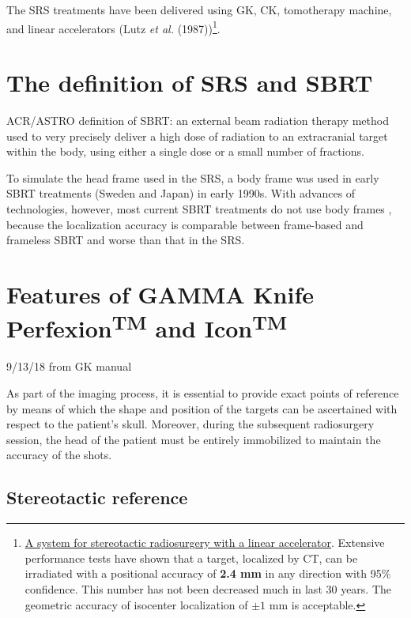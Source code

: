 \documentclass[]{book}
\let\rmarkdownfootnote\footnote%
\def\footnote{\protect\rmarkdownfootnote}
\theoremstyle{definition}
\theoremstyle{definition}
\theoremstyle{definition}
\theoremstyle{remark}
\begin{document}
The SRS treatments have been delivered using GK, CK, tomotherapy
machine, and linear accelerators (Lutz \emph{et al.} (1987))\footnote{\href{https://www.ncbi.nlm.nih.gov/pubmed/3276655}{A
  system for stereotactic radiosurgery with a linear accelerator}.
  Extensive performance tests have shown that a target, localized by CT,
  can be irradiated with a positional accuracy of \textbf{2.4 mm} in any
  direction with 95\% confidence. This number has not been decreased
  much in last 30 years. The geometric accuracy of isocenter
  localization of \(\pm1\) mm is acceptable.}.

\section{The definition of SRS and
SBRT}\label{the-definition-of-srs-and-sbrt}

ACR/ASTRO definition of SBRT: an external beam radiation therapy method
used to very precisely deliver a high dose of radiation to an
extracranial target within the body, using either a single dose or a
small number of fractions.

To simulate the head frame used in the SRS, a body frame was used in
early SBRT treatments (Sweden and Japan) in early 1990s. With advances
of technologies, however, most current SBRT treatments do not use body
frames , because the localization accuracy is comparable between
frame-based and frameless SBRT and worse than that in the SRS.

\section{\texorpdfstring{Features of GAMMA Knife
Perfexion\textsuperscript{TM} and
Icon\textsuperscript{TM}}{Features of GAMMA Knife PerfexionTM and IconTM}}\label{features-of-gamma-knife-perfexiontm-and-icontm}

9/13/18 from GK manual

As part of the imaging process, it is essential to provide exact points
of reference by means of which the shape and position of the targets can
be ascertained with respect to the patient's skull. Moreover, during the
subsequent radiosurgery session, the head of the patient must be
entirely immobilized to maintain the accuracy of the shots.

\subsection{Stereotactic reference}\label{stereotactic-reference}
\end{document}
